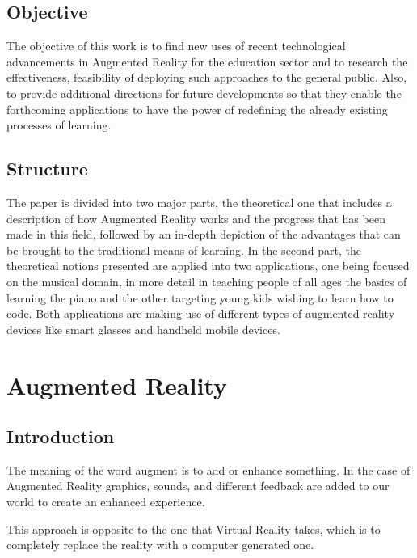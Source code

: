 \documentclass[12 pct]{report}
\begin{document}
\section{Objective}
The objective of this work is to find new uses of recent technological advancements in Augmented Reality for the education sector and to research the effectiveness, feasibility of deploying such approaches to the general public. Also, to provide additional directions for future developments so that they enable the forthcoming applications to have the power of redefining the already existing processes of learning.

\section{Structure}
The paper is divided into two major parts, the theoretical one that includes a description of how Augmented Reality works and the progress that has been made in this field, followed by an in-depth depiction of the advantages that can be brought to the traditional means of learning. In the second part, the theoretical notions presented are applied into two applications, one being focused on the musical domain, in more detail in teaching people of all ages the basics of learning the piano and the other targeting young kids wishing to learn how to code. Both applications are making use of different types of augmented reality devices like smart glasses and handheld mobile devices.
\chapter{Augmented Reality}

\section{Introduction}
The meaning of the word augment is to add or enhance something. In the case of Augmented Reality \cite{milgram1995augmented} graphics, sounds, and different feedback are added to our world to create an enhanced experience.

This approach is opposite to the one that Virtual Reality \cite{burdea2003virtual}  takes, which is to completely replace the reality with a computer generated one.
\end{document}
